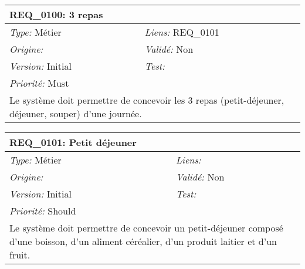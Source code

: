 
\begin{table}[!h]

\begin{tabular}{|p{60mm}p{100mm}|}

\hline

\multicolumn{2}{|l|}{\textbf{REQ\_0100:} 3 repas} \\ \hline

\emph{Type:} Métier & \emph{Liens:} REQ\_0101  \\

\emph{Origine:}  & \emph{Validé:} Non \\

\emph{Version:} Initial & \emph{Test:}  \\

\emph{Priorité:} Must & \\ \hline

\multicolumn{2}{|p{16cm}|}{Le système doit permettre de concevoir les 3 repas (petit-déjeuner, déjeuner, souper) d'une journée.} \\ \hline

\end{tabular}

\end{table}



\begin{table}[!h]

\begin{tabular}{|p{60mm}p{100mm}|}

\hline

\multicolumn{2}{|l|}{\textbf{REQ\_0101:} Petit déjeuner} \\ \hline

\emph{Type:} Métier & \emph{Liens:}  \\

\emph{Origine:}  & \emph{Validé:} Non \\

\emph{Version:} Initial & \emph{Test:}  \\

\emph{Priorité:} Should & \\ \hline

\multicolumn{2}{|p{16cm}|}{Le système doit permettre de concevoir un petit-déjeuner composé d'une boisson, d'un aliment céréalier, d'un produit laitier et d'un fruit.} \\ \hline

\end{tabular}

\end{table}




